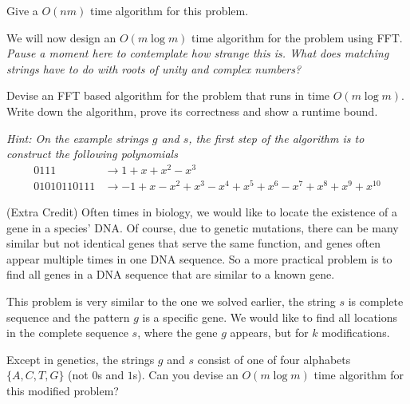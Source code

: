 \documentclass{article}
\begin{document}
\begin{subparts}
\subpart Give a $O(nm)$ time algorithm for this problem.

\noindent We will now design an $O(m \log m)$ time algorithm for the problem using FFT. {\it Pause a moment here to contemplate how strange this is. What does matching strings  have to do with roots of unity and complex numbers?}

\subpart Devise an FFT based algorithm for the problem that runs in time $O(m \log m)$.  Write down the algorithm, prove its correctness and show a runtime bound.

{\it Hint: On the example strings $g$ and $s$, the first step of the algorithm is to construct the following polynomials 
\begin{align*}
    0111 & \rightarrow 1 + x + x^2 - x^3 \\
    01010110111 & \rightarrow -1 + x -x^2 + x^3 - x^4 + x^5 +x^6 - x^7 + x^8 + x^9 + x^{10}
\end{align*}

}

\subpart (Extra Credit) 
Often times in biology, we would like to locate the existence of a gene in a species' DNA. Of course, due to genetic mutations, 
there can be many similar but not identical genes that serve the same function, and genes often appear multiple times in one DNA sequence. 
So a more practical problem is to find all genes in a DNA sequence that are similar to a known gene.

This problem is very similar to the one we solved earlier, the string $s$ is complete sequence and the pattern $g$ is a specific gene.  We would like to find all locations in the complete sequence $s$, where the gene $g$ appears, but for $k$ modifications.

Except in genetics, the strings $g$ and $s$ consist of one of four alphabets $\{A,C,T,G\}$ (not $0$s and $1$s).  Can you devise an $O(m \log m)$ time algorithm for this modified problem?

\end{subparts}
\end{document}
